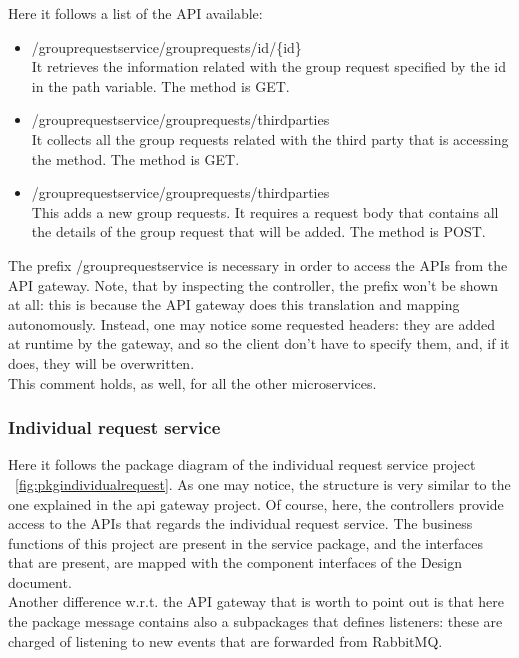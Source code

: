 Here it follows a list of the API available:
\begin{itemize}

\item /grouprequestservice/grouprequests/id/\{id\} \\
It retrieves the information related with the group request specified by the id in the
path variable. 
The method is GET.

\item /grouprequestservice/grouprequests/thirdparties \\
It collects all the group requests related with the third party that is accessing the method. 
The method is GET.

\item /grouprequestservice/grouprequests/thirdparties \\
This adds a new group requests. It requires a request body that contains all the details of the group
request that will be added.
The method is POST.

\end{itemize}

The prefix /grouprequestservice is necessary in order to access the APIs from the API gateway. 
Note, that by inspecting the controller, the prefix won't be shown at all: this is because the API gateway does this translation 
and mapping autonomously. Instead, one may notice some requested headers: they are added at runtime by the gateway, and so the client
don't have to specify them, and, if it does, they will be overwritten. \\
This comment holds, as well, for all the other microservices.


\subsubsection{Individual request service}
Here it follows the package diagram of the individual request service project ~\ref{fig:pkgindividualrequest}. 
As one may notice, the structure is very similar to the one explained in the api gateway project. 
Of course, here, the controllers provide access to the APIs that regards the individual request service. 
The business functions of this project are present in the  service package, and the interfaces that are present, 
are mapped with the component interfaces of the Design document. \\
Another difference w.r.t. the API gateway that is worth to point out is that here the package message contains also a subpackages that
defines listeners: these are charged of listening to new events that are forwarded from RabbitMQ. 

